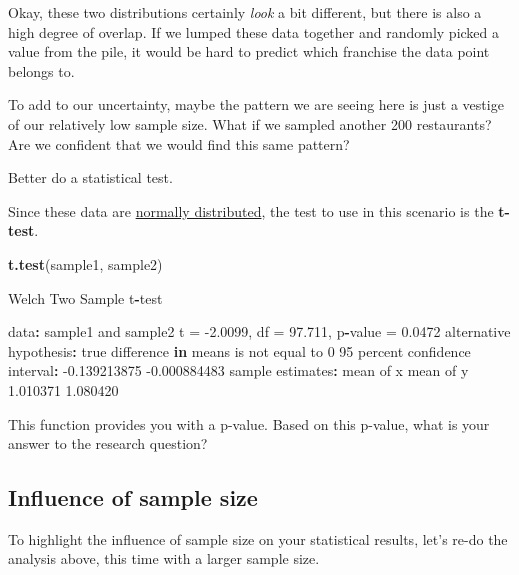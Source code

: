 \documentclass[]{book}
\newenvironment{Shaded}{\begin{snugshade}}{\end{snugshade}}
\newcommand{\ControlFlowTok}[1]{\textcolor[rgb]{0.13,0.29,0.53}{\textbf{#1}}}
\newcommand{\DecValTok}[1]{\textcolor[rgb]{0.00,0.00,0.81}{#1}}
\newcommand{\FloatTok}[1]{\textcolor[rgb]{0.00,0.00,0.81}{#1}}
\newcommand{\KeywordTok}[1]{\textcolor[rgb]{0.13,0.29,0.53}{\textbf{#1}}}
\newcommand{\NormalTok}[1]{#1}
\newcommand{\OperatorTok}[1]{\textcolor[rgb]{0.81,0.36,0.00}{\textbf{#1}}}
\newcommand{\StringTok}[1]{\textcolor[rgb]{0.31,0.60,0.02}{#1}}
\begin{document}
Okay, these two distributions certainly \emph{look} a bit different, but there is also a high degree of overlap. If we lumped these data together and randomly picked a value from the pile, it would be hard to predict which franchise the data point belongs to.

To add to our uncertainty, maybe the pattern we are seeing here is just a vestige of our relatively low sample size. What if we sampled another 200 restaurants? Are we confident that we would find this same pattern?

Better do a statistical test.

Since these data are \href{https://www.mathsisfun.com/data/standard-normal-distribution.html}{normally distributed}, the test to use in this scenario is the \textbf{t-test}.

\begin{Shaded}
\begin{Highlighting}[]
\KeywordTok{t.test}\NormalTok{(sample1, }
\NormalTok{       sample2)}

\NormalTok{    Welch Two Sample t}\OperatorTok{-}\NormalTok{test}

\NormalTok{data}\OperatorTok{:}\StringTok{  }\NormalTok{sample1 and sample2}
\NormalTok{t =}\StringTok{ }\FloatTok{-2.0099}\NormalTok{, df =}\StringTok{ }\FloatTok{97.711}\NormalTok{, p}\OperatorTok{-}\NormalTok{value =}\StringTok{ }\FloatTok{0.0472}
\NormalTok{alternative hypothesis}\OperatorTok{:}\StringTok{ }\NormalTok{true difference }\ControlFlowTok{in}\NormalTok{ means is not equal to }\DecValTok{0}
\DecValTok{95}\NormalTok{ percent confidence interval}\OperatorTok{:}
\StringTok{ }\FloatTok{-0.139213875} \FloatTok{-0.000884483}
\NormalTok{sample estimates}\OperatorTok{:}
\NormalTok{mean of x mean of y }
 \FloatTok{1.010371}  \FloatTok{1.080420} 
\end{Highlighting}
\end{Shaded}

This function provides you with a p-value. Based on this p-value, what is your answer to the research question?

\hypertarget{influence-of-sample-size}{%
\subsection*{Influence of sample size}\label{influence-of-sample-size}}

To highlight the influence of sample size on your statistical results, let's re-do the analysis above, this time with a larger sample size.
\end{document}
